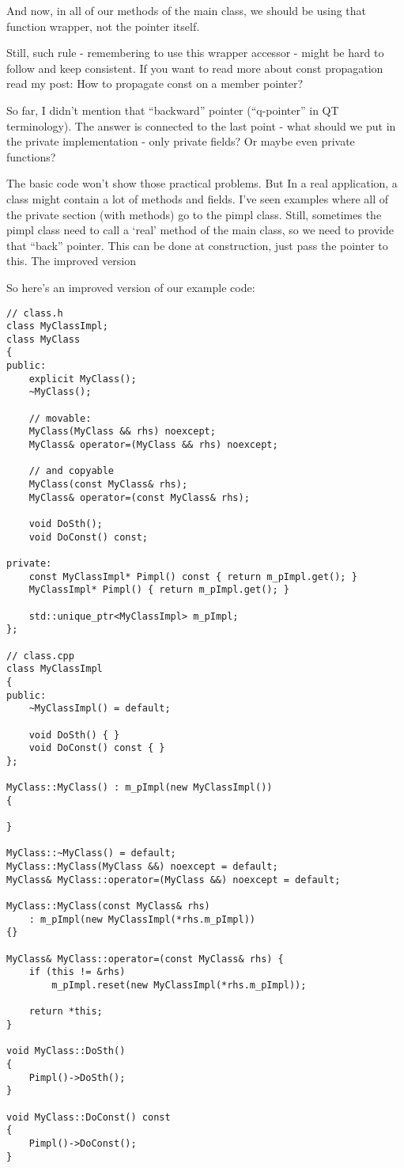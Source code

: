 \documentclass{book}
\begin{document}
And now, in all of our methods of the main class, we should be using that function wrapper, not the pointer itself.

Still, such rule - remembering to use this wrapper accessor - might be hard to follow and keep consistent. If you want to read more about const propagation read my post: How to propagate const on a member pointer?

So far, I didn’t mention that “backward” pointer (“q-pointer” in QT terminology). The answer is connected to the last point - what should we put in the private implementation - only private fields? Or maybe even private functions?

The basic code won’t show those practical problems. But In a real application, a class might contain a lot of methods and fields. I’ve seen examples where all of the private section (with methods) go to the pimpl class. Still, sometimes the pimpl class need to call a ‘real’ method of the main class, so we need to provide that “back” pointer. This can be done at construction, just pass the pointer to this.
The improved version

So here’s an improved version of our example code:

\begin{lstlisting}
// class.h
class MyClassImpl;
class MyClass
{
public:
    explicit MyClass();
    ~MyClass(); 

    // movable:
    MyClass(MyClass && rhs) noexcept;   
    MyClass& operator=(MyClass && rhs) noexcept;

    // and copyable
    MyClass(const MyClass& rhs);
    MyClass& operator=(const MyClass& rhs);

    void DoSth();
    void DoConst() const;

private:
    const MyClassImpl* Pimpl() const { return m_pImpl.get(); }
    MyClassImpl* Pimpl() { return m_pImpl.get(); }

    std::unique_ptr<MyClassImpl> m_pImpl;
};

// class.cpp
class MyClassImpl
{
public:
    ~MyClassImpl() = default;

    void DoSth() { }
    void DoConst() const { }
};

MyClass::MyClass() : m_pImpl(new MyClassImpl()) 
{

}

MyClass::~MyClass() = default;
MyClass::MyClass(MyClass &&) noexcept = default;
MyClass& MyClass::operator=(MyClass &&) noexcept = default;

MyClass::MyClass(const MyClass& rhs)
    : m_pImpl(new MyClassImpl(*rhs.m_pImpl))
{}

MyClass& MyClass::operator=(const MyClass& rhs) {
    if (this != &rhs) 
        m_pImpl.reset(new MyClassImpl(*rhs.m_pImpl));

    return *this;
}

void MyClass::DoSth()
{
    Pimpl()->DoSth();
}

void MyClass::DoConst() const
{
    Pimpl()->DoConst();
}
\end{lstlisting}
\end{document}
